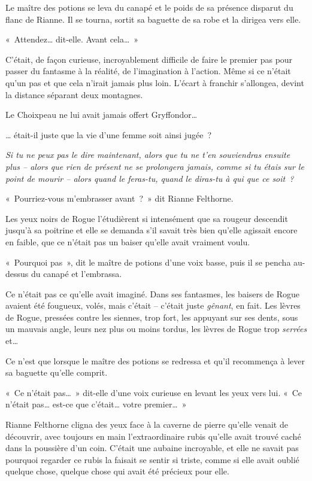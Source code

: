 Le maître des potions se leva du canapé et le poids de sa présence disparut du flanc de Rianne.
Il se tourna, sortit sa baguette de sa robe et la dirigea vers elle.

«~Attendez… dit-elle.
Avant cela…~»

C'était, de façon curieuse, incroyablement difficile de faire le premier pas pour passer du fantasme à la réalité, de l'imagination à l'action.
Même si ce n'était qu'un pas et que cela n'irait jamais plus loin.
L'écart à franchir s'allongea, devint la distance séparant deux montagnes.

Le Choixpeau ne lui avait jamais offert Gryffondor…

… était-il juste que la vie d'une femme soit ainsi jugée~?

\emph{Si tu ne peux pas le dire maintenant, alors que tu ne t'en souviendras ensuite plus -- alors que rien de présent ne se prolongera jamais, comme si tu étais sur le point de mourir -- alors quand le feras-tu, quand le diras-tu à qui que ce soit~?}

«~Pourriez-vous m'embrasser avant~?~»
dit Rianne Felthorne.

Les yeux noirs de Rogue l'étudièrent si intensément que sa rougeur descendit jusqu'à sa poitrine et elle se demanda s'il savait très bien qu'elle agissait encore en faible, que ce n'était pas un baiser qu'elle avait vraiment voulu.

«~Pourquoi pas~», dit le maître de potions d'une voix basse, puis il se pencha au-dessus du canapé et l'embrassa.

Ce n'était pas ce qu'elle avait imaginé.
Dans ses fantasmes, les baisers de Rogue avaient été fougueux, volés, mais c'était -- c'était juste \emph{gênant}, en fait.
Les lèvres de Rogue, pressées contre les siennes, trop fort, les appuyant sur ses dents, sous un mauvais angle, leurs nez plus ou moins tordus, les lèvres de Rogue trop \emph{serrées} et…

Ce n'est que lorsque le maître des potions se redressa et qu'il recommença à lever sa baguette qu'elle comprit.

«~Ce n'était pas…~»
dit-elle d'une voix curieuse en levant les yeux vers lui.
«~Ce n'était pas… est-ce que c'était… votre premier…~»

Rianne Felthorne cligna des yeux face à la caverne de pierre qu'elle venait de découvrir, avec toujours en main l'extraordinaire rubis qu'elle avait trouvé caché dans la poussière d'un coin.
C'était une aubaine incroyable, et elle ne savait pas pourquoi regarder ce rubis la faisait se sentir si triste, comme si elle avait oublié quelque chose, quelque chose qui avait été précieux pour elle.
